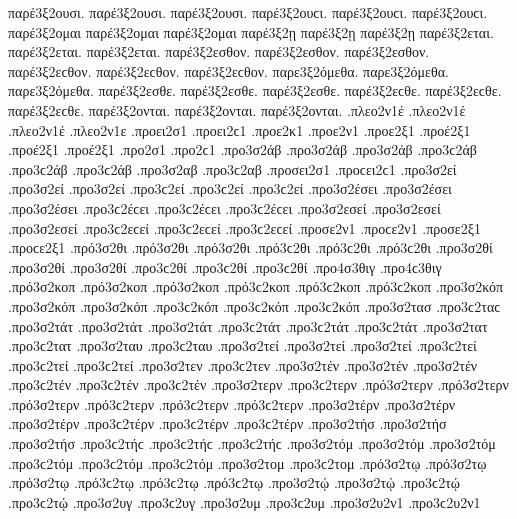 {παρέ3ξ2ουσι. παρέ3ξ2ουσι. παρέ3ξ2ουσι. παρέ3ξ2ουϲι. παρέ3ξ2ουϲι. παρέ3ξ2ουϲι. 
παρέ3ξ2ομαι παρέ3ξ2ομαι παρέ3ξ2ομαι 
παρέ3ξ2ῃ παρέ3ξ2ῃ παρέ3ξ2ῃ 
παρέ3ξ2εται. παρέ3ξ2εται. παρέ3ξ2εται. 
παρέ3ξ2εσθον. παρέ3ξ2εσθον. παρέ3ξ2εσθον. παρέ3ξ2εϲθον. παρέ3ξ2εϲθον. παρέ3ξ2εϲθον. 
παρε3ξ2όμεθα. παρε3ξ2όμεθα. παρε3ξ2όμεθα. 
παρέ3ξ2εσθε. παρέ3ξ2εσθε. παρέ3ξ2εσθε. παρέ3ξ2εϲθε. παρέ3ξ2εϲθε. παρέ3ξ2εϲθε. 
παρέ3ξ2ονται. παρέ3ξ2ονται. παρέ3ξ2ονται. 
.πλεο2ν1έ .πλεο2ν1έ .πλεο2ν1έ   %
.πλεο2ν1ε 
.προει2σ1 .προει2ϲ1   %
.προε2κ1   %
.προε2ν1   %
.προε2ξ1   %
.προέ2ξ1 .προέ2ξ1 .προέ2ξ1   %
.προ2σ1 .προ2ϲ1 
.προ3σ2άβ .προ3σ2άβ .προ3σ2άβ .προ3ϲ2άβ .προ3ϲ2άβ .προ3ϲ2άβ   %
.προ3σ2αβ .προ3ϲ2αβ 
.προσει2σ1 .προϲει2ϲ1   %
.προ3σ2εί .προ3σ2εί .προ3σ2εί .προ3ϲ2εί .προ3ϲ2εί .προ3ϲ2εί   %
.προ3σ2έσει .προ3σ2έσει .προ3σ2έσει .προ3ϲ2έϲει .προ3ϲ2έϲει .προ3ϲ2έϲει 
.προ3σ2εσεί .προ3σ2εσεί .προ3σ2εσεί .προ3ϲ2εϲεί .προ3ϲ2εϲεί .προ3ϲ2εϲεί 
.προσε2ν1 .προϲε2ν1   %
.προσε2ξ1 .προϲε2ξ1   %
.πρό3σ2θι .πρό3σ2θι .πρό3σ2θι .πρό3ϲ2θι .πρό3ϲ2θι .πρό3ϲ2θι   %
.προ3σ2θί .προ3σ2θί .προ3σ2θί .προ3ϲ2θί .προ3ϲ2θί .προ3ϲ2θί 
.προ4σ3θιγ .προ4ϲ3θιγ   %
.πρό3σ2κοπ .πρό3σ2κοπ .πρό3σ2κοπ .πρό3ϲ2κοπ .πρό3ϲ2κοπ .πρό3ϲ2κοπ   %
.προ3σ2κόπ .προ3σ2κόπ .προ3σ2κόπ .προ3ϲ2κόπ .προ3ϲ2κόπ .προ3ϲ2κόπ 
.προ3σ2τασ .προ3ϲ2ταϲ   %
.προ3σ2τάτ .προ3σ2τάτ .προ3σ2τάτ .προ3ϲ2τάτ .προ3ϲ2τάτ .προ3ϲ2τάτ   %
.προ3σ2τατ .προ3ϲ2τατ   %
.προ3σ2ταυ .προ3ϲ2ταυ   %
.προ3σ2τεί .προ3σ2τεί .προ3σ2τεί .προ3ϲ2τεί .προ3ϲ2τεί .προ3ϲ2τεί   %
.προ3σ2τεν .προ3ϲ2τεν   %
.προ3σ2τέν .προ3σ2τέν .προ3σ2τέν .προ3ϲ2τέν .προ3ϲ2τέν .προ3ϲ2τέν   %
.προ3σ2τερν .προ3ϲ2τερν   %
.πρό3σ2τερν .πρό3σ2τερν .πρό3σ2τερν .πρό3ϲ2τερν .πρό3ϲ2τερν .πρό3ϲ2τερν   %
.προ3σ2τέρν .προ3σ2τέρν .προ3σ2τέρν .προ3ϲ2τέρν .προ3ϲ2τέρν .προ3ϲ2τέρν 
.προ3σ2τήσ .προ3σ2τήσ .προ3σ2τήσ .προ3ϲ2τήϲ .προ3ϲ2τήϲ .προ3ϲ2τήϲ   %
.προ3σ2τόμ .προ3σ2τόμ .προ3σ2τόμ .προ3ϲ2τόμ .προ3ϲ2τόμ .προ3ϲ2τόμ   %
.προ3σ2τομ .προ3ϲ2τομ 
.πρό3σ2τῳ .πρό3σ2τῳ .πρό3σ2τῳ .πρό3ϲ2τῳ .πρό3ϲ2τῳ .πρό3ϲ2τῳ   %
.προ3σ2τῴ .προ3σ2τῴ .προ3ϲ2τῴ .προ3ϲ2τῴ 
.προ3σ2υγ .προ3ϲ2υγ   %
.προ3σ2υμ .προ3ϲ2υμ   %
.προ3σ2υ2ν1 .προ3ϲ2υ2ν1   %
}
